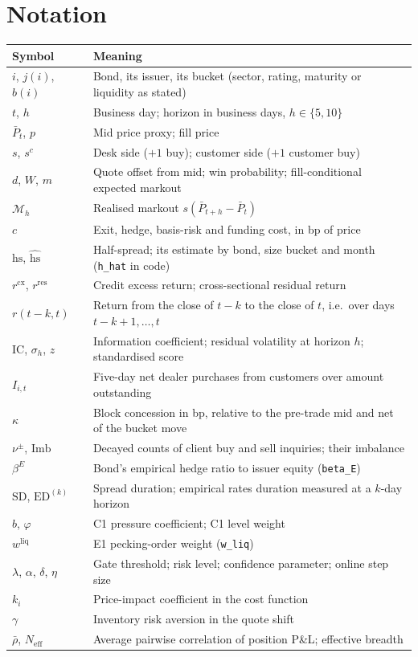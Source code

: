 \documentclass[11pt,letterpaper]{article}
\newcommand{\code}[1]{\texttt{#1}}
\newcommand{\Pm}{\bar{P}}                 %
\newcommand{\hs}{\mathrm{hs}}             %
\newcommand{\SD}{\mathrm{SD}}             %
\newcommand{\rres}{r^{\mathrm{res}}}      %
\newcommand{\rcx}{r^{\mathrm{cx}}}        %
\newcommand{\Imb}{\mathrm{Imb}}
\newcommand{\Neff}{N_{\mathrm{eff}}}
\begin{document}
\section{Notation}
\begin{center}
\begin{longtable}{@{}p{}p{}@{}}
\toprule
Symbol & Meaning \\
\midrule
\endhead
$i$, $j(i)$, $b(i)$ & Bond, its issuer, its bucket (sector, rating, maturity or liquidity as stated) \\
$t$, $h$ & Business day; horizon in business days, $h\in\{5,10\}$ \\
$\Pm_t$, $p$ & Mid price proxy; fill price \\
$s$, $s^{c}$ & Desk side ($+1$ buy); customer side ($+1$ customer buy) \\
$d$, $W$, $m$ & Quote offset from mid; win probability; fill-conditional expected markout \\
$\mathcal{M}_h$ & Realised markout $s(\Pm_{t+h}-\Pm_t)$ \\
$c$ & Exit, hedge, basis-risk and funding cost, in bp of price \\
$\hs$, $\widehat{\hs}$ & Half-spread; its estimate by bond, size bucket and month (\code{h_hat} in code) \\
$\rcx$, $\rres$ & Credit excess return; cross-sectional residual return \\
$r(t-k,t)$ & Return from the close of $t-k$ to the close of $t$, i.e.\ over days $t-k+1,\dots,t$ \\
$\mathrm{IC}$, $\sigma_h$, $z$ & Information coefficient; residual volatility at horizon $h$; standardised score \\
$I_{i,t}$ & Five-day net dealer purchases from customers over amount outstanding \\
$\kappa$ & Block concession in bp, relative to the pre-trade mid and net of the bucket move \\
$\nu^{\pm}$, $\Imb$ & Decayed counts of client buy and sell inquiries; their imbalance \\
$\beta^{E}$ & Bond's empirical hedge ratio to issuer equity (\code{beta_E}) \\
$\SD$, $\mathrm{ED}^{(k)}$ & Spread duration; empirical rates duration measured at a $k$-day horizon \\
$b$, $\varphi$ & C1 pressure coefficient; C1 level weight \\
$w^{\mathrm{liq}}$ & E1 pecking-order weight (\code{w_liq}) \\
$\lambda$, $\alpha$, $\delta$, $\eta$ & Gate threshold; risk level; confidence parameter; online step size \\
$k_i$ & Price-impact coefficient in the cost function \\
$\gamma$ & Inventory risk aversion in the quote shift \\
$\bar\rho$, $\Neff$ & Average pairwise correlation of position P\&L; effective breadth \\
\bottomrule
\end{longtable}
\end{center}
\end{document}
